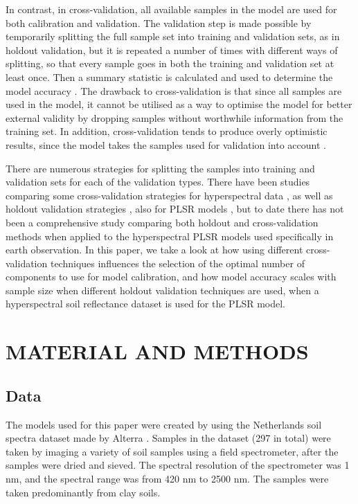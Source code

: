 \documentclass{isprs}
\begin{document}
In contrast, in cross-validation, all available samples in the model are used for both calibration and validation. The validation step is made possible by temporarily splitting the full sample set into training and validation sets, as in holdout validation, but it is repeated a number of times with different ways of splitting, so that every sample goes in both the training and validation set at least once. Then a summary statistic is calculated and used to determine the model accuracy \cite{kohavi1995study}. The drawback to cross-validation is that since all samples are used in the model, it cannot be utilised as a way to optimise the model for better external validity by dropping samples without worthwhile information from the training set. In addition, cross-validation tends to produce overly optimistic results, since the model takes the samples used for validation into account \cite{clark2003boosted}.

There are numerous strategies for splitting the samples into training and validation sets for each of the validation types. There have been studies comparing some cross-validation strategies for hyperspectral data \cite{molinaro2005prediction}, as well as holdout validation strategies \cite{roy2008exploring}, also for PLSR models \cite{clark2003boosted}, but to date there has not been a comprehensive study comparing both holdout and cross-validation methods when applied to the hyperspectral PLSR models used specifically in earth observation. In this paper, we take a look at how using different cross-validation techniques influences the selection of the optimal number of components to use for model calibration, and how model accuracy scales with sample size when different holdout validation techniques are used, when a hyperspectral soil reflectance dataset is used for the PLSR model.

\section{MATERIAL AND METHODS}\label{sec:METHODS}

\subsection{Data}\label{sec:Data}

The models used for this paper were created by using the Netherlands soil spectra dataset made by Alterra \cite{groenestijn2009}. Samples in the dataset (297 in total) were taken by imaging a variety of soil samples using a field spectrometer, after the samples were dried and sieved. The spectral resolution of the spectrometer was 1 nm, and the spectral range was from 420 nm to 2500 nm. The samples were taken predominantly from clay soils.
\end{document}
